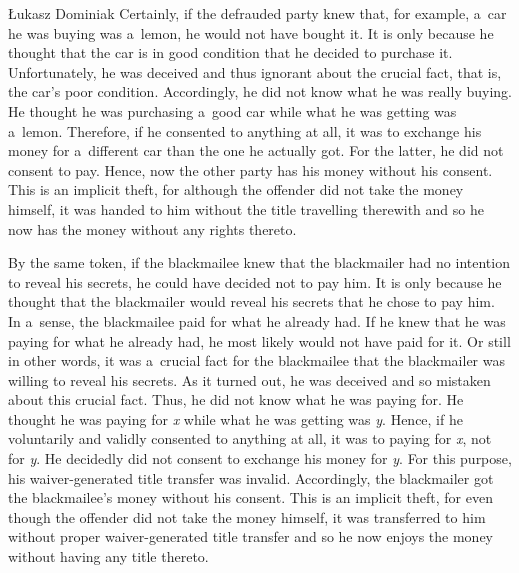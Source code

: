 \begin{artengenv}{Łukasz Dominiak}
Certainly, if the defrauded party knew that, for example, a~car he was buying was a~lemon, he would not have bought it. It is only because he thought that the car is in good condition that he decided to purchase it. Unfortunately, he was deceived and thus ignorant about the crucial fact, that is, the car's poor condition. Accordingly, he did not know what he was really buying. He thought he was purchasing a~good car while what he was getting was a~lemon. Therefore, if he consented to anything at all, it was to exchange his money for a~different car than the one he actually got. For the latter, he did not consent to pay. Hence, now the other party has his money without his consent. This is an implicit theft, for although the offender did not take the money himself, it was handed to him without the title travelling therewith and so he now has the money without any rights thereto.



By the same token, if the blackmailee knew that the blackmailer had no intention to reveal his secrets, he could have decided not to pay him. It is only because he thought that the blackmailer would reveal his secrets that he chose to pay him. In a~sense, the blackmailee paid for what he already had. If he knew that he was paying for what he already had, he most likely would not have paid for it. Or still in other words, it was a~crucial fact for the blackmailee that the blackmailer was willing to reveal his secrets. As it turned out, he was deceived and so mistaken about this crucial fact. Thus, he did not know what he was paying for. He thought he was paying for \textit{x} while what he was getting was \textit{y}. Hence, if he voluntarily and validly consented to anything at all, it was to paying for \textit{x}, not for \textit{y}. He decidedly did not consent to exchange his money for \textit{y}. For this purpose, his waiver-generated title transfer was invalid. Accordingly, the blackmailer got the blackmailee's money without his consent. This is an implicit theft, for even though the offender did not take the money himself, it was transferred to him without proper waiver-generated title transfer and so he now enjoys the money without having any title thereto.




\end{artengenv}
